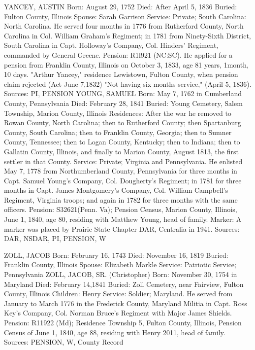 YANCEY, AUSTIN 
Born: August 29, 1752 
Died: After April 5, 1836 
Buried: Fulton County, Illinois 
Spouse: Sarah Garrison 
Service: Private; South Carolina: North Carolina. He served four months in 1776 from Rutherford County, North Carolina in Col. William Graham's Regiment; in 1781 from Ninety-Sixth District, South Carolina in Capt. Holloway's Com­pany, Col. Hinders' Regiment, commanded by General Greene. 
Pension: R1l921 (NC:SC). He applied for a pension from Franklin County, Illinois on October 3, 1833, age 81 years, 1month, 10 days. "Arthur Yancey," residence Lewistown, Fulton County, when pension claim rejected (Act June 7,1832) "Not having six months service," (April 5, 1836).
Sources: PI, PENSION 
YOUNG, SAMUEL 
Born: May 7, 1762 in Cumberland County, Pennsylvania 
Died: February 28, 1841 
Buried: Young Cemetery, Salem Township, Marion County, Illinois 
Residences: After the war he removed to Rowan County, North Carolina; then to Rutherford County; then Spartanburg County, South Carolina; then to Frank­lin County, Georgia; then to Sumner County, Tennessee; then to Logan County, Kentucky; then to Indiana; then to Gallatin County, Illinois, and finally to Marion County, August 1813, the first settler in that County.
Service: Private; Virginia and Pennsylvania. He enlisted May 7, 1778 from North­umberland County, Pennsylvania for three months in Capt. Samuel Young's Company, Col. Dougherty's Regiment; in 1781 for three months in Capt. James Montgomery's Company, Col. William Campbell's Regiment, Virginia troops; and again in 1782 for three months with the same officers. 
Pension: S32621(Penn. Va); Pension Census, Marion County, Illinois, June 1, 1840, age 80, residing with Matthew Young, head of family. 
Marker: A marker was placed by Prairie State Chapter DAR, Centralia in 1941. 
Sources: DAR, NSDAR, PI, PENSION, W 

ZOLL, JACOB 
Born: February 16, 1743 
Died: November 16, 1819
Buried: Franklin County, Illinois 
Spouse: Elizabeth Markle 
Service: Patriotic Service; Pennsylvania 
ZOLL, JACOB, SR. (Christopher)
Born: November 30, 1754 in Maryland
Died: February 14,1841
Buried: Zoll Cemetery, near Fairview, Fulton County, Illinois
Children: Henry
Service: Soldier; Maryland. He served from January to March 1776 in the Frederick County, Maryland Militia in Capt. Ross Key's Company, Col. Norman Bruce's Regiment with Major James Shields.
Pension: R11922 (Md); Residence Township 5, Fulton County, Illinois, Pension Census of June 1, 1840, age 88, residing with Henry 2011, head of family.
Sources: PENSION, W, County Record
